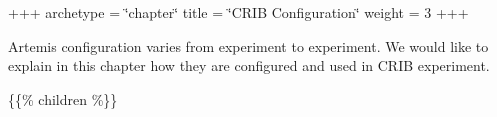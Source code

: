 +++ archetype = \char`\"{}chapter\char`\"{} title = \char`\"{}\+CRIB Configuration\char`\"{} weight = 3 +++

Artemis configuration varies from experiment to experiment. We would like to explain in this chapter how they are configured and used in CRIB experiment.

\{\{\% children \%\}\} 